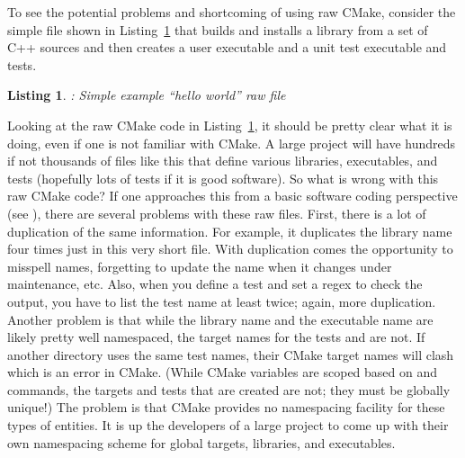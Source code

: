 \documentclass[note]{TechNote}
\newtheorem{listing}{Listing}
\begin{document}
To see the potential problems and shortcoming of using raw CMake, consider the simple  file shown in Listing~\ref{listing:RawHelloWorld} that builds and installs a library from a set of C++ sources and then creates a user executable and a unit test executable and tests.

\begin{listing}: Simple example ``hello world'' raw  file
\label{listing:RawHelloWorld}
{\small

}
\end{listing}

Looking at the raw CMake code in Listing~\ref{listing:RawHelloWorld}, it should be pretty clear what it is doing, even if one is not familiar with CMake.  A large project will have hundreds if not thousands of  files like this that define various libraries, executables, and tests (hopefully lots of tests if it is good software).  So what is wrong with this raw CMake code?  If one approaches this from a basic software coding perspective (see \cite{CodeComplete2nd04}), there are several problems with these raw  files.  First, there is a lot of duplication of the same information.  For example, it duplicates the library name  four times just in this very short file.  With duplication comes the opportunity to misspell names, forgetting to update the name when it changes under maintenance, etc.  Also, when you define a test and set a regex to check the output, you have to list the test name at least twice; again, more duplication.  Another problem is that while the library name  and the executable name  are likely pretty well namespaced, the target names for the tests  and  are not.  If another directory uses the same test names, their CMake target names will clash which is an error in CMake.  (While CMake variables are scoped based on  and  commands, the targets and tests that are created are not; they must be globally unique!)  The problem is that CMake provides no namespacing facility for these types of entities.  It is up the developers of a large project to come up with their own namespacing scheme for global targets, libraries, and executables.
\end{document}
